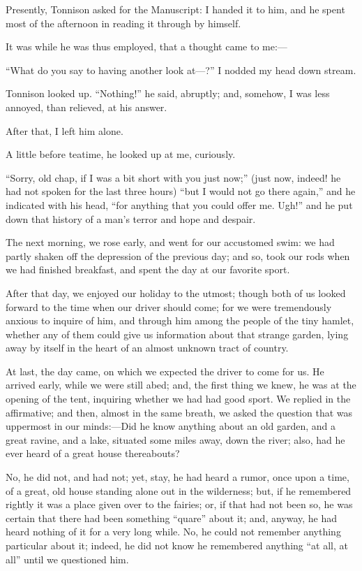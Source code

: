 Presently, Tonnison asked for the Manuscript: I handed it to him, and he spent most of the afternoon in reading it through by himself.

It was while he was thus employed, that a thought came to me:---

“What do you say to having another look at---?” I nodded my head down stream.

Tonnison looked up. “Nothing!” he said, abruptly; and, somehow, I was less annoyed, than relieved, at his answer.

After that, I left him alone.

A little before teatime, he looked up at me, curiously.

“Sorry, old chap, if I was a bit short with you just now;” (just now, indeed! he had not spoken for the last three hours) “but I would not go there again,” and he indicated with his head, “for anything that you could offer me. Ugh!” and he put down that history of a man’s terror and hope and despair.

The next morning, we rose early, and went for our accustomed swim: we had partly shaken off the depression of the previous day; and so, took our rods when we had finished breakfast, and spent the day at our favorite sport.

After that day, we enjoyed our holiday to the utmost; though both of us looked forward to the time when our driver should come; for we were tremendously anxious to inquire of him, and through him among the people of the tiny hamlet, whether any of them could give us information about that strange garden, lying away by itself in the heart of an almost unknown tract of country.

At last, the day came, on which we expected the driver to come for us. He arrived early, while we were still abed; and, the first thing we knew, he was at the opening of the tent, inquiring whether we had had good sport. We replied in the affirmative; and then, almost in the same breath, we asked the question that was uppermost in our minds:---Did he know anything about an old garden, and a great ravine, and a lake, situated some miles away, down the river; also, had he ever heard of a great house thereabouts?

No, he did not, and had not; yet, stay, he had heard a rumor, once upon a time, of a great, old house standing alone out in the wilderness; but, if he remembered rightly it was a place given over to the fairies; or, if that had not been so, he was certain that there had been something “quare” about it; and, anyway, he had heard nothing of it for a very long while. No, he could not remember anything particular about it; indeed, he did not know he remembered anything “at all, at all” until we questioned him.

